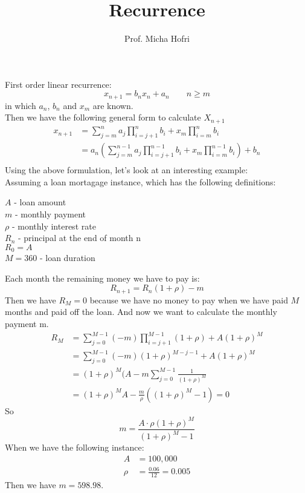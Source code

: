 \documentclass{article}
\title{Recurrence}
\author{Prof. Micha Hofri}
\begin{document}
\maketitle
First order linear recurrence:\\
\[
x_{n+1}=b_nx_n+a_n\qquad n\geq m
\]
in which ${a_n}$, ${b_n}$ and $x_m$ are known.\\
Then we have the following general form to calculate $X_{n+1}$\\
\begin{align*}
x_{n+1}&=\sum_{j=m}^na_j\prod_{i=j+1}^nb_i+x_m\prod_{i=m}^nb_i \\
&=a_n(\sum_{j=m}^{n-1}a_j\prod_{i=j+1}^{n-1}b_i+x_m\prod_{i=m}^{n-1}b_i)+b_n \\
\end{align*}
Using the above formulation, let's look at an interesting example:\\
Assuming a loan mortagage instance, which has the following definitions:\\
\begin{center}
$A$ - loan amount \\
$m$ - monthly payment \\
$\rho$ - monthly interest rate \\
$R_n$ - principal at the end of month n \\
$R_0=A$ \\
$M=360$ - loan duration \\
\end{center}
Each month the remaining money we have to pay is:
\[
R_{n+1}=R_n(1+\rho)-m
\]
Then we have $R_M=0$ because we have no money to pay when we have paid
$M$ months and paid off the loan. And now we want to calculate the
monthly payment m.\\
\begin{align*}
  R_M&=\sum_{j=0}^{M-1}(-m)\prod_{i=j+1}^{M-1}(1+\rho)+A(1+\rho)^M\\
  &=\sum_{j=0}^{M-1}(-m)(1+\rho)^{M-j-1}+A(1+\rho)^M\\
  &=(1+\rho)^M(A-m\sum_{j=0}^{M-1}\frac{1}{(1+\rho)^M}\\
  &=(1+\rho)^MA-\frac{m}{\rho}((1+\rho)^M-1)=0
\end{align*}
So
\[
m=\frac{A\cdot\rho(1+\rho)^M}{(1+\rho)^M-1}
\]
When we have the following instance:
\begin{align*}
A&=100,000\\
\rho&=\frac{0.06}{12}=0.005
\end{align*}
Then we have $m=598.98$. \\
\end{document}
